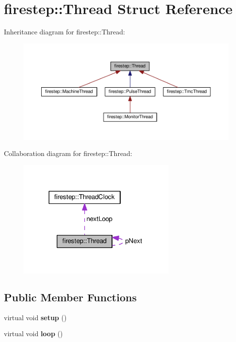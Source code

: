 \hypertarget{structfirestep_1_1_thread}{\section{firestep\+:\+:Thread Struct Reference}
\label{structfirestep_1_1_thread}
}


Inheritance diagram for firestep\+:\+:Thread\+:
\nopagebreak
\begin{figure}[H]
\begin{center}
\leavevmode
\includegraphics[width=350pt]{structfirestep_1_1_thread__inherit__graph}
\end{center}
\end{figure}


Collaboration diagram for firestep\+:\+:Thread\+:\nopagebreak
\begin{figure}[H]
\begin{center}
\leavevmode
\includegraphics[width=225pt]{structfirestep_1_1_thread__coll__graph}
\end{center}
\end{figure}
\subsection*{Public Member Functions}
\begin{DoxyCompactItemize}
\item 
\hypertarget{structfirestep_1_1_thread_ac38e34ed047af769da29d3ea0de7a9af}{virtual void {\bfseries setup} ()}\label{structfirestep_1_1_thread_ac38e34ed047af769da29d3ea0de7a9af}

\item 
\hypertarget{structfirestep_1_1_thread_a1d0bdb9bf79a9ccb654d7cad0cbae0d8}{virtual void {\bfseries loop} ()}\label{structfirestep_1_1_thread_a1d0bdb9bf79a9ccb654d7cad0cbae0d8}

\end{DoxyCompactItemize}
